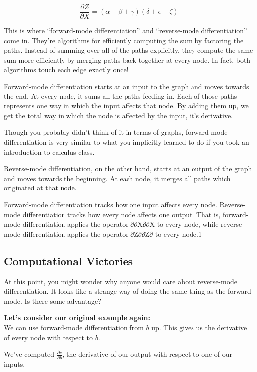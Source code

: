 \documentclass[a4paper,12pt]{report}%
\begin{document}
\begin{equation}
\frac{\partial Z}{\partial X} = (\alpha + \beta + \gamma) (\delta + \epsilon + \zeta)
\end{equation}

This is where “forward-mode differentiation” and “reverse-mode differentiation” come in. They’re algorithms for efficiently computing the sum by factoring the paths. Instead of summing over all of the paths explicitly, they compute the same sum more efficiently by merging paths back together at every node. In fact, both algorithms touch each edge exactly once!

Forward-mode differentiation starts at an input to the graph and moves towards the end. At every node, it sums all the paths feeding in. Each of those paths represents one way in which the input affects that node. By adding them up, we get the total way in which the node is affected by the input, it’s derivative.


Though you probably didn’t think of it in terms of graphs, forward-mode differentiation is very similar to what you implicitly learned to do if you took an introduction to calculus class.

Reverse-mode differentiation, on the other hand, starts at an output of the graph and moves towards the beginning. At each node, it merges all paths which originated at that node.


Forward-mode differentiation tracks how one input affects every node. Reverse-mode differentiation tracks how every node affects one output. That is, forward-mode differentiation applies the operator ∂∂X∂∂X to every node, while reverse mode differentiation applies the operator ∂Z∂∂Z∂ to every node.1

\subsection{Computational Victories}
At this point, you might wonder why anyone would care about reverse-mode differentiation. It looks like a strange way of doing the same thing as the forward-mode. Is there some advantage?

{\bf Let’s consider our original example again:} \\

We can use forward-mode differentiation from $b$ up. This gives us the derivative of every node with respect to $b$.

We’ve computed $\frac{\partial e}{\partial b}$, the derivative of our output with respect to one of our inputs.
\end{document}

